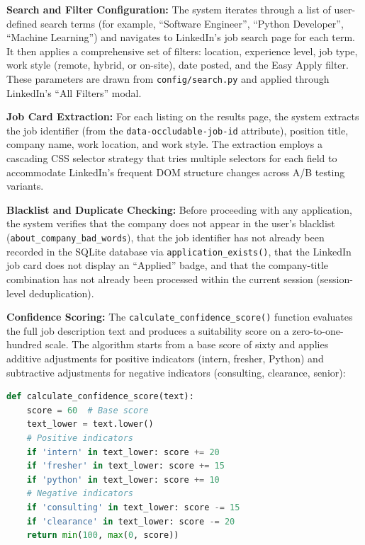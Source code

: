 \documentclass[12pt, a4paper, oneside]{report}
\begin{document}
\textbf{Search and Filter Configuration:} The system iterates through a list of user-defined search terms (for example, ``Software Engineer'', ``Python Developer'', ``Machine Learning'') and navigates to LinkedIn's job search page for each term. It then applies a comprehensive set of filters: location, experience level, job type, work style (remote, hybrid, or on-site), date posted, and the Easy Apply filter. These parameters are drawn from \texttt{config/search.py} and applied through LinkedIn's ``All Filters'' modal.

\textbf{Job Card Extraction:} For each listing on the results page, the system extracts the job identifier (from the \texttt{data-occludable-job-id} attribute), position title, company name, work location, and work style. The extraction employs a cascading CSS selector strategy that tries multiple selectors for each field to accommodate LinkedIn's frequent DOM structure changes across A/B testing variants.

\textbf{Blacklist and Duplicate Checking:} Before proceeding with any application, the system verifies that the company does not appear in the user's blacklist (\texttt{about\_company\_bad\_words}), that the job identifier has not already been recorded in the SQLite database via \texttt{application\_exists()}, that the LinkedIn job card does not display an ``Applied'' badge, and that the company-title combination has not already been processed within the current session (session-level deduplication).

\textbf{Confidence Scoring:} The \texttt{calculate\_confidence\_score()} function evaluates the full job description text and produces a suitability score on a zero-to-one-hundred scale. The algorithm starts from a base score of sixty and applies additive adjustments for positive indicators (intern, fresher, Python) and subtractive adjustments for negative indicators (consulting, clearance, senior):

\begin{lstlisting}[language=Python, caption={Confidence Scoring Algorithm (Simplified)}, label={lst:confidence}]
def calculate_confidence_score(text):
    score = 60  # Base score
    text_lower = text.lower()
    # Positive indicators
    if 'intern' in text_lower: score += 20
    if 'fresher' in text_lower: score += 15
    if 'python' in text_lower: score += 10
    # Negative indicators
    if 'consulting' in text_lower: score -= 15
    if 'clearance' in text_lower: score -= 20
    return min(100, max(0, score))
\end{lstlisting}
\end{document}
